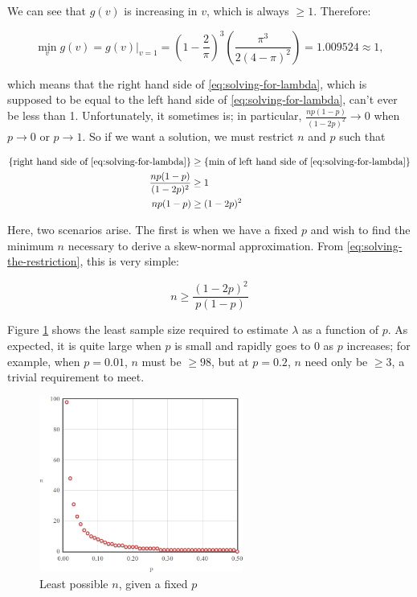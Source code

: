 \documentclass{article}
\begin{document}
We can see that $g(v)$ is increasing in $v$, which is always $\geq 1$.
Therefore:

\begin{equation}
  \min_{v} g(v) = g(v)|_{v=1} = \left( 1 - \frac{2}{\pi} \right)^3 \left( \frac{\pi^3}{2(4-\pi)^2} \right) = 1.009524 \approx 1,
\end{equation}

which means that the right hand side of \eqref{eq:solving-for-lambda}, which is
supposed to be equal to the left hand side of \eqref{eq:solving-for-lambda},
can't ever be less than 1. Unfortunately, it sometimes is; in particular,
$\frac{np(1-p)}{(1-2p)^2} \to 0$ when $p \to 0$ or $p \to 1$. So if we want a
solution, we must restrict $n$ and $p$ such that

\begin{align}
  \textnormal{\{right hand side of \eqref{eq:solving-for-lambda}\}} &\geq \textnormal{\{min of left hand side of \eqref{eq:solving-for-lambda}\}} \nonumber \\
  \frac{np(1-p)}{(1-2p)^2} &\geq 1 \nonumber \\
  np(1-p) &\geq (1-2p)^2 \label{eq:solving-the-restriction}
\end{align}

Here, two scenarios arise. The first is when we have a fixed $p$ and wish to
find the minimum $n$ necessary to derive a skew-normal approximation. From
\eqref{eq:solving-the-restriction}, this is very simple:

\begin{equation}
  n \geq \frac{(1-2p)^2}{p(1-p)} \label{eq: n for a given p}
\end{equation}

Figure \ref{fig:sn-restriction-least-n} shows the least sample size required to
estimate $\lambda$ as a function of $p$. As expected, it is quite large when
$p$ is small and rapidly goes to 0 as $p$ increases; for example, when $p =
0.01$, $n$ must be $\geq 98$, but at $p = 0.2$, $n$ need only be $\geq 3$, a
trivial requirement to meet.

\begin{figure}
  \centering
  \includegraphics[width=0.6\textwidth]{../graphs/images/restriction-least-n.png}
  \caption{Least possible $n$, given a fixed $p$}
  \label{fig:sn-restriction-least-n}
\end{figure}
\end{document}
